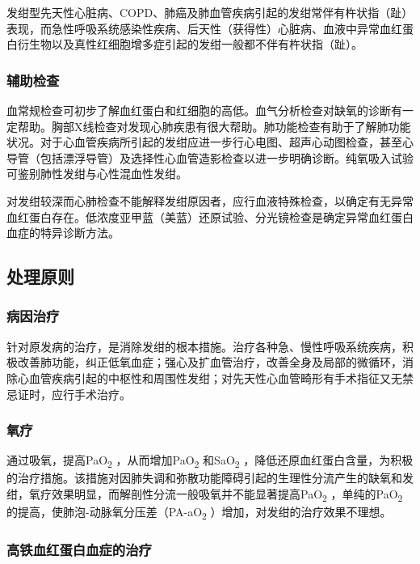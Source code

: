 发绀型先天性心脏病、COPD、肺癌及肺血管疾病引起的发绀常伴有杵状指（趾）表现，而急性呼吸系统感染性疾病、后天性（获得性）心脏病、血液中异常血红蛋白衍生物以及真性红细胞增多症引起的发绀一般都不伴有杵状指（趾）。

\subsubsection{辅助检查}

血常规检查可初步了解血红蛋白和红细胞的高低。血气分析检查对缺氧的诊断有一定帮助。胸部X线检查对发现心肺疾患有很大帮助。肺功能检查有助于了解肺功能状况。对于心血管疾病所引起的发绀应进一步行心电图、超声心动图检查，甚至心导管（包括漂浮导管）及选择性心血管造影检查以进一步明确诊断。纯氧吸入试验可鉴别肺性发绀与心性混血性发绀。

对发绀较深而心肺检查不能解释发绀原因者，应行血液特殊检查，以确定有无异常血红蛋白存在。低浓度亚甲蓝（美蓝）还原试验、分光镜检查是确定异常血红蛋白血症的特异诊断方法。

\subsection{处理原则}

\subsubsection{病因治疗}

针对原发病的治疗，是消除发绀的根本措施。治疗各种急、慢性呼吸系统疾病，积极改善肺功能，纠正低氧血症；强心及扩血管治疗，改善全身及局部的微循环，消除心血管疾病引起的中枢性和周围性发绀；对先天性心血管畸形有手术指征又无禁忌证时，应行手术治疗。

\subsubsection{氧疗}

通过吸氧，提高PaO\textsubscript{2} ，从而增加PaO\textsubscript{2}
和SaO\textsubscript{2}
，降低还原血红蛋白含量，为积极的治疗措施。该措施对因肺失调和弥散功能障碍引起的生理性分流产生的缺氧和发绀，氧疗效果明显，而解剖性分流一般吸氧并不能显著提高PaO\textsubscript{2}
，单纯的PaO\textsubscript{2}
的提高，使肺泡-动脉氧分压差（PA-aO\textsubscript{2}
）增加，对发绀的治疗效果不理想。

\subsubsection{高铁血红蛋白血症的治疗}

